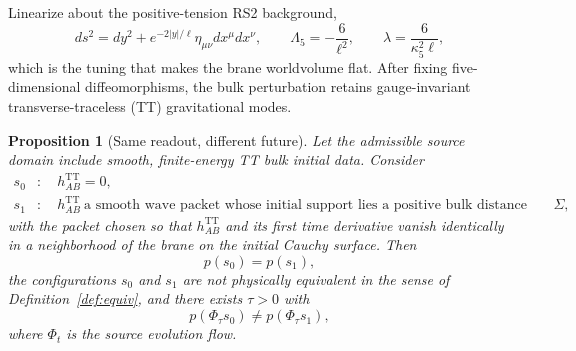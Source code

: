 \documentclass[11pt,a4paper]{article}
\theoremstyle{plain}
\newtheorem{proposition}[theorem]{Proposition}
\theoremstyle{definition}
\newcommand{\kfive}{\kappa_5}
\newcommand{\Lfive}{\Lambda_5}
\newcommand{\TT}{\mathrm{TT}}
\begin{document}
Linearize about the positive-tension RS2 background,
\begin{equation}
\label{eq:background}
ds^2=dy^2+e^{-2|y|/\ell}\eta_{\mu\nu}dx^\mu dx^\nu,
\qquad
\Lfive=-\frac{6}{\ell^2},
\qquad
\lambda=\frac{6}{\kfive^2\ell},
\end{equation}
which is the tuning that makes the brane worldvolume flat. After fixing
five-dimensional diffeomorphisms, the bulk perturbation retains
gauge-invariant transverse-traceless (TT) gravitational modes.

\begin{proposition}[Same readout, different future]
\label{prop:witness}
Let the admissible source domain include smooth, finite-energy TT bulk
initial data. Consider
\begin{align}
s_0&:\quad h^{\TT}_{AB}=0,
\label{eq:s0}\\
s_1&:\quad h^{\TT}_{AB}\ \text{a smooth wave packet whose initial
support lies a positive bulk distance from }\Sigma,
\label{eq:s1}
\end{align}
with the packet chosen so that $h^{\TT}_{AB}$ and its first time
derivative vanish identically in a neighborhood of the brane on the
initial Cauchy surface. Then
\begin{equation}
\label{eq:samereadout}
p(s_0)=p(s_1),
\end{equation}
the configurations $s_0$ and $s_1$ are not physically equivalent in the
sense of Definition~\ref{def:equiv}, and there exists $\tau>0$ with
\begin{equation}
\label{eq:diffFuture}
p(\Phi_\tau s_0)\ne p(\Phi_\tau s_1),
\end{equation}
where $\Phi_t$ is the source evolution flow.
\end{proposition}
\end{document}
